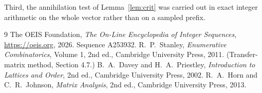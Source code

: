 \documentclass[11pt,a4paper]{article}
\theoremstyle{plain}
\theoremstyle{definition}
\begin{document}
Third, the annihilation test of Lemma~\ref{lem:crit} was carried out in exact integer
arithmetic on the whole vector rather than on a sampled prefix.

\begin{thebibliography}{9}
 The OEIS Foundation, \emph{The On-Line Encyclopedia of Integer
Sequences}, \url{https://oeis.org}, 2026. Sequence A253932.
 R.~P.~Stanley, \emph{Enumerative Combinatorics}, Volume 1, 2nd ed.,
Cambridge University Press, 2011. (Transfer-matrix method, Section 4.7.)
 B.~A.~Davey and H.~A.~Priestley, \emph{Introduction to Lattices and
Order}, 2nd ed., Cambridge University Press, 2002.
 R.~A.~Horn and C.~R.~Johnson, \emph{Matrix Analysis}, 2nd ed., Cambridge
University Press, 2013.
\end{thebibliography}
\end{document}

